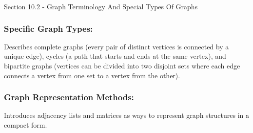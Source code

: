 \begin{notes}{Section 10.2 - Graph Terminology And Special Types Of Graphs}
    \subsubsection*{Specific Graph Types:}

    Describes complete graphs (every pair of distinct vertices is connected by a unique edge), cycles (a path that starts and ends at the same vertex), and bipartite graphs (vertices can be divided 
    into two disjoint sets where each edge connects a vertex from one set to a vertex from the other). \vspace*{1em}

    \subsubsection*{Graph Representation Methods:}

    Introduces adjacency lists and matrices as ways to represent graph structures in a compact form.
\end{notes}